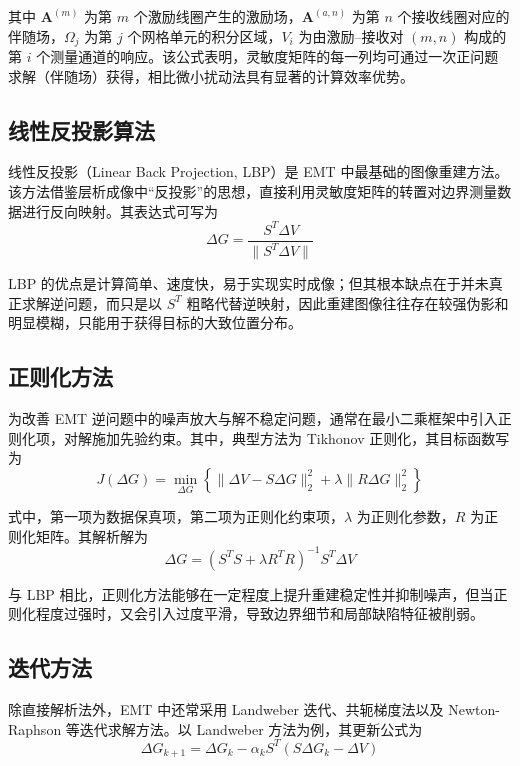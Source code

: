 其中 $\mathbf{A}^{(m)}$ 为第 $m$ 个激励线圈产生的激励场，$\mathbf{A}^{(a,n)}$ 为第 $n$ 个接收线圈对应的伴随场，$\Omega_j$ 为第 $j$ 个网格单元的积分区域，$V_i$ 为由激励--接收对 $(m,n)$ 构成的第 $i$ 个测量通道的响应。该公式表明，灵敏度矩阵的每一列均可通过一次正问题求解（伴随场）获得，相比微小扰动法具有显著的计算效率优势。

\subsection{线性反投影算法}

线性反投影（Linear Back Projection, LBP）是 EMT 中最基础的图像重建方法。该方法借鉴层析成像中“反投影”的思想，直接利用灵敏度矩阵的转置对边界测量数据进行反向映射。其表达式可写为
\begin{equation}
\label{eqn:LBP}
\Delta G =
\frac{S^T\Delta V}{\|S^T\Delta V\|}
\end{equation}

LBP 的优点是计算简单、速度快，易于实现实时成像；但其根本缺点在于并未真正求解逆问题，而只是以 $S^T$ 粗略代替逆映射，因此重建图像往往存在较强伪影和明显模糊，只能用于获得目标的大致位置分布。

\subsection{正则化方法}

为改善 EMT 逆问题中的噪声放大与解不稳定问题，通常在最小二乘框架中引入正则化项，对解施加先验约束。其中，典型方法为 Tikhonov 正则化，其目标函数写为
\begin{equation}
\label{eqn:Tikhonov}
J(\Delta G)
=
\min_{\Delta G}
\left\{
\|\Delta V-S\Delta G\|_2^2
+
\lambda\|R\Delta G\|_2^2
\right\}
\end{equation}

式中，第一项为数据保真项，第二项为正则化约束项，$\lambda$ 为正则化参数，$R$ 为正则化矩阵。其解析解为
\begin{equation}
\label{eqn:Tikhonov_solution}
\Delta G =
(S^TS+\lambda R^TR)^{-1}S^T\Delta V
\end{equation}

与 LBP 相比，正则化方法能够在一定程度上提升重建稳定性并抑制噪声，但当正则化程度过强时，又会引入过度平滑，导致边界细节和局部缺陷特征被削弱。

\subsection{迭代方法}

除直接解析法外，EMT 中还常采用 Landweber 迭代、共轭梯度法以及 Newton-Raphson 等迭代求解方法。以 Landweber 方法为例，其更新公式为
\begin{equation}
\label{eqn:Landweber}
\Delta G_{k+1}
=
\Delta G_k
-
\alpha_k S^T(S\Delta G_k-\Delta V)
\end{equation}

